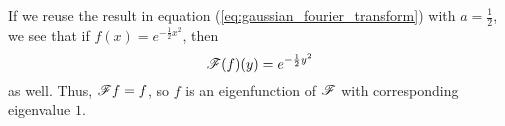 \documentclass{homework}
\begin{document}
\begin{arabicparts}
		\questionpart If we reuse the result in equation (\ref{eq:gaussian_fourier_transform}) with $a = \frac{1}{2}$, we see that if $f(x) = e^{-\frac{1}{2}x^2}$, then
		\begin{equation}
			\mathscr{F}(f)(y) = e^{-\frac{1}{2}y^2}
		\end{equation}
		as well. Thus, $\mathscr{F} f = f$, so $f$ is an eigenfunction of $\mathscr{F}$ with corresponding eigenvalue $1$.
	\end{arabicparts}
\end{document}

